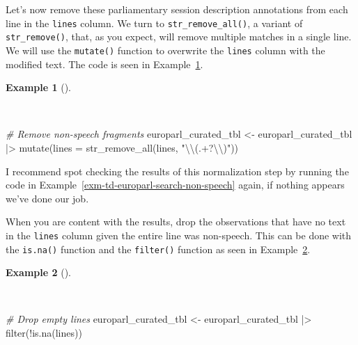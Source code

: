 \documentclass[
  letterpaper,
  DIV=11,
  numbers=noendperiod]{scrreport}
\newenvironment{Shaded}{\begin{snugshade}}{\end{snugshade}}
\newcommand{\AttributeTok}[1]{\textcolor[rgb]{0.00,0.00,0.00}{#1}}
\newcommand{\CommentTok}[1]{\textcolor[rgb]{0.00,0.00,0.00}{\textit{#1}}}
\newcommand{\FunctionTok}[1]{\textcolor[rgb]{0.00,0.00,0.00}{#1}}
\newcommand{\NormalTok}[1]{\textcolor[rgb]{0.00,0.00,0.00}{#1}}
\newcommand{\OtherTok}[1]{\textcolor[rgb]{0.00,0.00,0.00}{#1}}
\newcommand{\SpecialCharTok}[1]{\textcolor[rgb]{0.00,0.00,0.00}{#1}}
\newcommand{\StringTok}[1]{\textcolor[rgb]{0.00,0.00,0.00}{#1}}
\theoremstyle{definition}
\newtheorem{example}{Example}[chapter]
\theoremstyle{remark}
\begin{document}
Let's now remove these parliamentary session description annotations
from each line in the \texttt{lines} column. We turn to
\texttt{str\_remove\_all()}, a variant of \texttt{str\_remove()}, that,
as you expect, will remove multiple matches in a single line. We will
use the \texttt{mutate()} function to overwrite the \texttt{lines}
column with the modified text. The code is seen in
Example~\ref{exm-td-europarl-remove-non-speech}.

\begin{example}[]\protect\hypertarget{exm-td-europarl-remove-non-speech}{}\label{exm-td-europarl-remove-non-speech}

~

\begin{Shaded}
\begin{Highlighting}[]
\CommentTok{\# Remove non{-}speech fragments}
\NormalTok{europarl\_curated\_tbl }\OtherTok{\textless{}{-}} 
\NormalTok{  europarl\_curated\_tbl }\SpecialCharTok{|\textgreater{}}
  \FunctionTok{mutate}\NormalTok{(}\AttributeTok{lines =} \FunctionTok{str\_remove\_all}\NormalTok{(lines, }\StringTok{"}\SpecialCharTok{\textbackslash{}\textbackslash{}}\StringTok{(.+?}\SpecialCharTok{\textbackslash{}\textbackslash{}}\StringTok{)"}\NormalTok{))}
\end{Highlighting}
\end{Shaded}

\end{example}

I recommend spot checking the results of this normalization step by
running the code in Example~\ref{exm-td-europarl-search-non-speech}
again, if nothing appears we've done our job.

When you are content with the results, drop the observations that have
no text in the \texttt{lines} column given the entire line was
non-speech. This can be done with the \texttt{is.na()} function and the
\texttt{filter()} function as seen in
Example~\ref{exm-td-europarl-drop-empty-lines}.

\begin{example}[]\protect\hypertarget{exm-td-europarl-drop-empty-lines}{}\label{exm-td-europarl-drop-empty-lines}

~

\begin{Shaded}
\begin{Highlighting}[]
\CommentTok{\# Drop empty lines}
\NormalTok{europarl\_curated\_tbl }\OtherTok{\textless{}{-}} 
\NormalTok{  europarl\_curated\_tbl }\SpecialCharTok{|\textgreater{}}
  \FunctionTok{filter}\NormalTok{(}\SpecialCharTok{!}\FunctionTok{is.na}\NormalTok{(lines))}
\end{Highlighting}
\end{Shaded}

\end{example}
\end{document}

